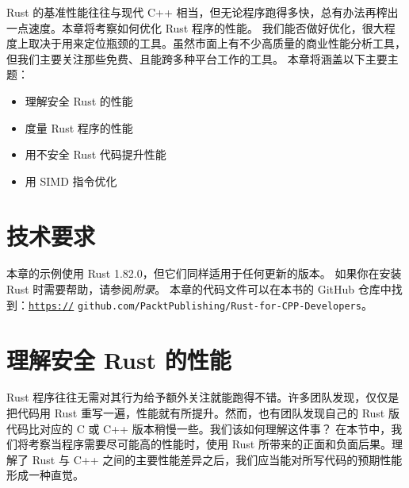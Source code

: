 Rust 的基准性能往往与现代 C++ 相当，但无论程序跑得多快，总有办法再榨出一点速度。本章将考察如何优化 Rust 程序的性能。
我们能否做好优化，很大程度上取决于用来定位瓶颈的工具。虽然市面上有不少高质量的商业性能分析工具，但我们主要关注那些免费、且能跨多种平台工作的工具。
本章将涵盖以下主要主题：
\begin{itemize}
  \item 理解安全 Rust 的性能
  \item 度量 Rust 程序的性能
  \item 用不安全 Rust 代码提升性能
  \item 用 SIMD 指令优化
\end{itemize}
\section{技术要求}
本章的示例使用 Rust 1.\allowbreak{}82.\allowbreak{}0，但它们同样适用于任何更新的版本。
如果你在安装 Rust 时需要帮助，请参阅\emph{附录}。
本章的代码文件可以在本书的 GitHub 仓库中找到：\href{https://}{\texttt{https://}}
\texttt{github.\allowbreak{}com/\allowbreak{}PacktPublishing/\allowbreak{}Rust-\allowbreak{}for-\allowbreak{}CPP-\allowbreak{}Developers}。
\section{理解安全 Rust 的性能}
\label{idx:idx_407166aa}
Rust 程序往往无需对其行为给予额外关注就能跑得不错。许多团队发现，仅仅是把代码用 Rust 重写一遍，性能就有所提升。然而，也有团队发现自己的 Rust 版代码比对应的 C 或 C++ 版本稍慢一些。我们该如何理解这件事？
在本节中，我们将考察当程序需要尽可能高的性能时，使用 Rust 所带来的正面和负面后果。理解了 Rust 与 C++ 之间的主要性能差异之后，我们应当能对所写代码的预期性能形成一种直觉。
